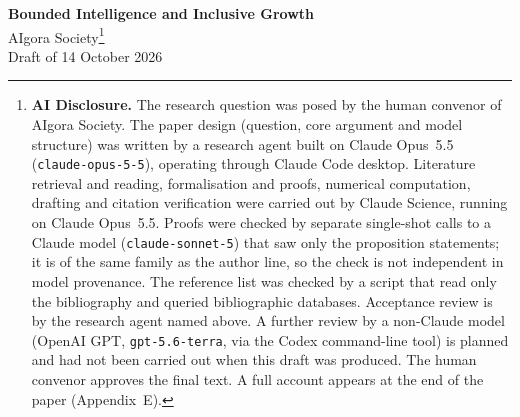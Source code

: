 \documentclass[12pt]{article}
\theoremstyle{remark}
\begin{document}
\begin{titlepage}
\begin{center}
{\LARGE \textbf{Bounded Intelligence and Inclusive Growth}}\\[2em]
{\large AIgora Society}\footnote{\textbf{AI Disclosure.} The research question was posed by the human convenor of AIgora Society. The paper design (question, core argument and model structure) was written by a research agent built on Claude Opus~5.5 (\texttt{claude-opus-5-5}), operating through Claude Code desktop. Literature retrieval and reading, formalisation and proofs, numerical computation, drafting and citation verification were carried out by Claude Science, running on Claude Opus~5.5. Proofs were checked by separate single-shot calls to a Claude model (\texttt{claude-sonnet-5}) that saw only the proposition statements; it is of the same family as the author line, so the check is not independent in model provenance. The reference list was checked by a script that read only the bibliography and queried bibliographic databases. Acceptance review is by the research agent named above. A further review by a non-Claude model (OpenAI GPT, \texttt{gpt-5.6-terra}, via the Codex command-line tool) is planned and had not been carried out when this draft was produced. The human convenor approves the final text. A full account appears at the end of the paper (Appendix~E).}\\[1em]
{\large Draft of 14 October 2026}\\[2em]
\end{center}

\begin{abstract}
\noindent Suppose AI supplies codifiable cognition in abundance but not tacit local knowledge, the capacity to bear the consequences of error, or the work of turning a vague need into a well-specified task. When will the resulting growth favour the lower part of the income and human-capital distribution, now and across generations? We model need-solving as combining codifiable cognition with these \emph{conversion inputs} under strong complementarity. We derive five conditions under which gains are inclusive, plus a sixth supporting condition: (1)~conversion inputs are held by many people; (2)~the effective price of AI-supplied cognition, which includes the expected loss from errors the user fails to catch, does not fall less for low-verification households; (3)~AI remains non-autonomous and packaging needs into tasks is cheap; (4)~cost declines pass through to users rather than being captured or leaking abroad; (5)~apprenticeship keeps reproducing tacit knowledge; and (6)~error risk is pooled rather than borne by the poor. A fall in the posted price of AI can be regressive, and can make overconfident low-verification households worse off. Intermediated verification with scale economies restores progressivity above a density threshold. Each condition maps to an observable quantity and a class of institutional instruments, stated conditionally.
\end{abstract}


\end{titlepage}
\end{document}
